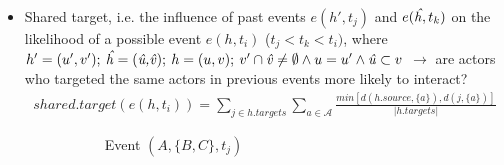 \begin{itemize}
\begin{itemize}
		\item Shared target, i.e. the influence of past events $e(h',t_j)$ and $e(\text{\emph{\^h}},t_k)$ on the likelihood of a possible event $e(h,t_i)$ ($t_j < t_k < t_i)$, where $h' = (u',v'); \: \text{\emph{\^h}} = (\text{\emph{\^u,\^v}}); \: h = (u,v); \: v' \cap \text{\emph{\^v}} \neq \emptyset \land u = u' \land \text{\emph{\^u}} \subset v$ $\rightarrow$ are actors who targeted the same actors in previous events more likely to interact?
		\begin{align*}
			shared.target(e(h,t_i)) = \sum_{j \in h.targets} \sum_{a \in \mathcal{A}} \frac{min[d(h.source,\{a\}),d(j,\{a\})]}{\lvert h.targets \rvert}
		\end{align*}
		\begin{figure}
			\begin{mdframed}
				\centering
				\begin{subfigure}[t]{0.3\linewidth}
					\vskip 0pt
					\caption{Event $(A,\{B,C\},t_j)$}
				\end{subfigure}
				\hfill
				\begin{subfigure}[t]{0.3\linewidth}
					\vskip 0pt
\end{subfigure}
\end{mdframed}
\end{figure}
\end{itemize}
\end{itemize}
